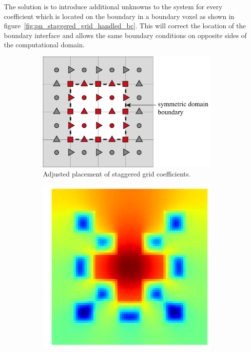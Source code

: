 The solution is to introduce additional unknowns to the system for every coefficient which is located on the boundary in a boundary voxel as shown in figure~\ref{fig:pn_staggered_grid_handled_bc}. This will correct the location of the boundary interface and allows the same boundary conditions on opposite sides of the computational domain.
\begin{figure}[h]
\centering
\begin{subfigure}[t]{0.49\columnwidth}
\centering
\includegraphics[width=1\textwidth]{04_pn_method/figures/fig_staggered_grid_domain_boundary_corrected.pdf}
\caption{Adjusted placement of staggered grid coefficients.}
\label{fig:pn_staggering_correct_bc}
\end{subfigure}%
\hspace{0.01\columnwidth}
\begin{subfigure}[t]{0.34\columnwidth}
\centering
\includegraphics[width=\columnwidth]{04_pn_method/results/checkerboard2d_p5_neumann_staggered.png}

\end{subfigure}
\end{figure}
